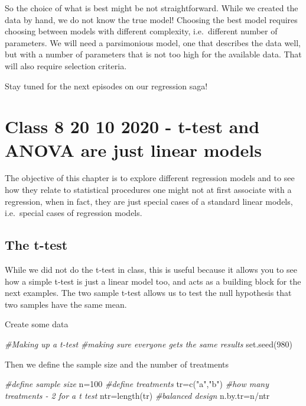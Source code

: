 \documentclass[
]{book}
\newenvironment{Shaded}{\begin{snugshade}}{\end{snugshade}}
\newcommand{\CommentTok}[1]{\textcolor[rgb]{0.56,0.35,0.01}{\textit{#1}}}
\newcommand{\DecValTok}[1]{\textcolor[rgb]{0.00,0.00,0.81}{#1}}
\newcommand{\FunctionTok}[1]{\textcolor[rgb]{0.00,0.00,0.00}{#1}}
\newcommand{\NormalTok}[1]{#1}
\newcommand{\OtherTok}[1]{\textcolor[rgb]{0.56,0.35,0.01}{#1}}
\newcommand{\SpecialCharTok}[1]{\textcolor[rgb]{0.00,0.00,0.00}{#1}}
\newcommand{\StringTok}[1]{\textcolor[rgb]{0.31,0.60,0.02}{#1}}
\begin{document}
So the choice of what is best might be not straightforward. While we created the data by hand, we do not know the true model! Choosing the best model requires choosing between models with different complexity, i.e.~different number of parameters. We will need a parsimonious model, one that describes the data well, but with a number of parameters that is not too high for the available data. That will also require selection criteria.

Stay tuned for the next episodes on our regression saga!

\hypertarget{aula8}{%
\chapter{Class 8 20 10 2020 - t-test and ANOVA are just linear models}\label{aula8}}

The objective of this chapter is to explore different regression models and to see how they relate to statistical procedures one might not at first associate with a regression, when in fact, they are just special cases of a standard linear models, i.e.~special cases of regression models.

\hypertarget{the-t-test}{%
\section{The t-test}\label{the-t-test}}

While we did not do the t-test in class, this is useful because it allows you to see how a simple t-test is just a linear model too, and acts as a building block for the next examples. The two sample t-test allows us to test the null hypothesis that two samples have the same mean.

Create some data

\begin{Shaded}
\begin{Highlighting}[]
\CommentTok{\#Making up a t{-}test}
\CommentTok{\#making sure everyone gets the same results}
\FunctionTok{set.seed}\NormalTok{(}\DecValTok{980}\NormalTok{)}
\end{Highlighting}
\end{Shaded}

Then we define the sample size and the number of treatments

\begin{Shaded}
\begin{Highlighting}[]
\CommentTok{\#define sample size}
\NormalTok{n}\OtherTok{=}\DecValTok{100}
\CommentTok{\#define treatments}
\NormalTok{tr}\OtherTok{=}\FunctionTok{c}\NormalTok{(}\StringTok{"a"}\NormalTok{,}\StringTok{"b"}\NormalTok{)}
\CommentTok{\#how many treatments {-} 2 for a t test}
\NormalTok{ntr}\OtherTok{=}\FunctionTok{length}\NormalTok{(tr)}
\CommentTok{\#balanced design}
\NormalTok{n.by.tr}\OtherTok{=}\NormalTok{n}\SpecialCharTok{/}\NormalTok{ntr}
\end{Highlighting}
\end{Shaded}
\end{document}
